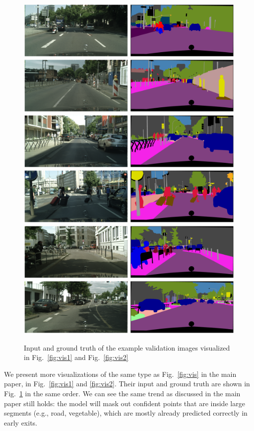 \begin{figure}[H]
\includegraphics[width=.50\textwidth]{images/vis_supp/input_gt_frankfurt_000000_017476.png}
\includegraphics[width=.50\textwidth]{images/vis_supp/input_gt_frankfurt_000001_005184.png}
\includegraphics[width=.50\textwidth]{images/vis_supp/input_gt_frankfurt_000001_028335.png}
\includegraphics[width=.50\textwidth]{images/vis_supp/input_gt_frankfurt_000001_037705.png}
\includegraphics[width=.50\textwidth]{images/vis_supp/input_gt_frankfurt_000001_064130.png}
\includegraphics[width=.50\textwidth]{images/vis_supp/input_gt_frankfurt_000001_080391.png}
\vspace{-4ex}
\caption{Input and ground truth of the example validation images visualized in Fig.~\ref{fig:vis1} and Fig.~\ref{fig:vis2}}
\label{fig:gt}
\end{figure}
\vspace{-2ex}
We present more visualizations of the same type as Fig.~\ref{fig:vis} in the main paper, in Fig.~\ref{fig:vis1} and \ref{fig:vis2}. Their input and ground truth are shown in Fig.~\ref{fig:gt} in the same order. We can see the same trend as discussed in the main paper still holds: the model will mask out confident points that are inside large segments (e.g., road, vegetable), which are mostly already predicted correctly in early exits.

